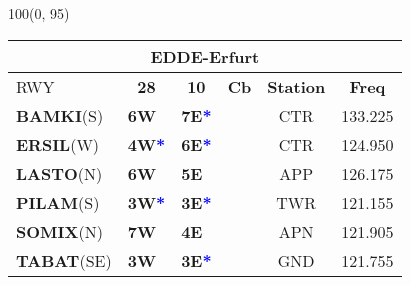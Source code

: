 \documentclass[10pt,landscape,a4paper]{article}
\begin{document}
\begin{textblock}{100}(0, 95)
\begin{table}[]
\begin{tabular}{|llllll}
\multicolumn{6}{c}{\textbf{EDDE-Erfurt}} \\ \hline
\multicolumn{1}{|l|}{RWY} 						& \multicolumn{1}{c|}{\textbf{28}} 				& \multicolumn{1}{c|}{\textbf{10}}  				& \multicolumn{1}{c|}{\textbf{Cb}} 						& \multicolumn{1}{c|}{\textbf{Station}} 	& \multicolumn{1}{c|}{\textbf{Freq}}	\\ \hline
\multicolumn{1}{|l|}{\textbf{BAMKI}(S)}				& \multicolumn{1}{l|}{\textbf{6W} }				& \multicolumn{1}{l|}{\textbf{7E\textcolor{blue}{*}}}	& \multicolumn{1}{c|}{\multirow{6}{*}{\rotatebox{90}{5000ft}}}		& \multicolumn{1}{c|}{CTR}			& \multicolumn{1}{c|}{133.225}	\\ \cline{1-3}
\multicolumn{1}{|l|}{\textbf{ERSIL}(W)}				& \multicolumn{1}{l|}{\textbf{4W\textcolor{blue}{*}}}	& \multicolumn{1}{l|}{\textbf{6E\textcolor{blue}{*}}}	& \multicolumn{1}{c|}{}  								& \multicolumn{1}{c|}{CTR}			& \multicolumn{1}{c|}{124.950}	\\ \cline{1-3}

\multicolumn{1}{|l|}{\textbf{LASTO}(N)} 				& \multicolumn{1}{l|}{\textbf{6W}} 				& \multicolumn{1}{l|}{\textbf{5E}}				& \multicolumn{1}{c|}{} 								& \multicolumn{1}{c|}{APP}			& \multicolumn{1}{c|}{126.175}	\\ \cline{1-3}
\multicolumn{1}{|l|}{\textbf{PILAM}(S)}				& \multicolumn{1}{l|}{\textbf{3W\textcolor{blue}{*}}}	& \multicolumn{1}{l|}{\textbf{3E\textcolor{blue}{*}}}	& \multicolumn{1}{c|}{} 								& \multicolumn{1}{c|}{TWR} 			& \multicolumn{1}{c|}{121.155}		\\ \cline{1-3} 

\multicolumn{1}{|l|}{\textbf{SOMIX}(N)} 				& \multicolumn{1}{l|}{\textbf{7W}}				& \multicolumn{1}{l|}{\textbf{4E}}				& \multicolumn{1}{c|}{}								& \multicolumn{1}{c|}{APN}			& \multicolumn{1}{c|}{121.905} 	\\\cline{1-3}
\multicolumn{1}{|l|}{\textbf{TABAT}(SE)} 				& \multicolumn{1}{l|}{\textbf{3W}} 				& \multicolumn{1}{l|}{\textbf{3E\textcolor{blue}{*}}}	& \multicolumn{1}{c|}{}  								& \multicolumn{1}{c|}{GND}			& \multicolumn{1}{c|}{121.755} \\ \hline
\end{tabular}
\end{table}
\end{textblock}
\end{document}
